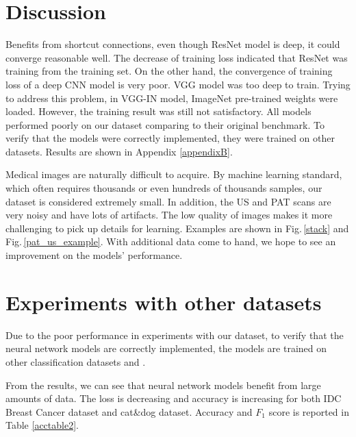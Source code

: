 \section{Discussion}
Benefits from shortcut connections, even though ResNet model is deep, it could converge reasonable well. The decrease of training loss indicated that ResNet was training from the training set. On the other hand, the convergence of training loss of a deep CNN model is very poor. VGG model was too deep to train. Trying to address this problem, in VGG-IN model, ImageNet pre-trained weights were loaded. However, the training result was still not satisfactory. All models performed poorly on our dataset comparing to their original benchmark. To verify that the models were correctly implemented, they were trained on other datasets. Results are shown in Appendix \ref{appendixB}. 

Medical images are naturally difficult to acquire. By machine learning standard, which often requires thousands or even hundreds of thousands samples, our dataset is considered extremely small. In addition, the US and PAT scans are very noisy and have lots of artifacts. The low quality of images makes it more challenging to pick up details for learning. Examples are shown in Fig.\,\ref{stack} and Fig.\,\ref{pat_us_example}. With additional data come to hand, we hope to see an improvement on the models' performance.

\section{Experiments with other datasets}

Due to the poor performance in experiments with our dataset, to verify that the neural network models are correctly implemented, the models are trained on other classification datasets \citep{Janowczyk2016} and \citep{catdog}.

From the results, we can see that neural network models benefit from large amounts of data. The loss is decreasing and accuracy is increasing for both IDC Breast Cancer dataset and cat\&dog dataset. Accuracy and $F_1$ score is reported in Table \ref{acctable2}.


